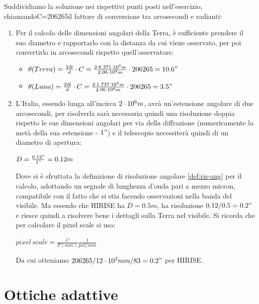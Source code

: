 \begin{sol}
	Suddividiamo la soluzione nei rispettivi punti posti nell’esercizio, chiamandoC=206265il fattore di conversione tra arcosecondi e radianti:
	\begin{enumerate}
		\item Per il calcolo delle dimensioni angolari della Terra, è sufficiente prendere il suo diametro e rapportarlo con la distanza da cui viene osservato, per poi convertirlo in arcosecondi rispetto quell'osservatore:
		\begin{itemize}
			\item $\theta(Terra)=\frac{2R}{d}\cdot C=\frac{2\cdot 6.371\cdot 10^{6}m}{2.06\cdot 10^{8}m}\cdot 206265=10.6"$
			\item  $\theta(Luna)=\frac{2R}{d}\cdot C=\frac{2\cdot 1.737\cdot 10^{6}m}{2.06\cdot 10^{8}m}\cdot 206265=3.5"$
		\end{itemize}
		\item L'Italia, essendo lunga all'incirca $2\cdot 10^{6}m$, avrà un'estensione angolare di due arcosecondi, per risolverla sarà necessaria quindi una risoluzione doppia rispetto le sue dimensioni angolari per via della diffrazione (numericamente la metà della sua estensione - $1"$) e il telescopio necessiterà quindi di un diametro di apertura:
		
		$D=\frac{0.12"}{1"}=0.12m$
		
		Dove si è sfruttata la definizione di risoluzione angolare \ref{def:ris-ang} per il calcolo, adottando un segnale di lunghezza d'onda pari a mezzo micron, compatibile con il fatto che si stia facendo osservazioni nella banda del visibile. Ma essendo che HIRISE ha $D=0.5m$, ha risoluzione $0.12/0.5=0.2"$ e riesce quindi a risolvere bene i dettagli sulla Terra nel visibile. Si ricorda che per calcolare il pixel scale si usa:

		$pixel \, scale = \frac{C}{F(mm)}\frac{1}{pxl/mm}$

		Da cui otteniamo $206265/12\cdot 10^{3}mm/83=0.2"$ per HIRISE.
	\end{enumerate}
\end{sol}

\section{Ottiche adattive}

